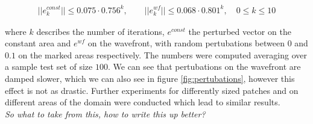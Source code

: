 \documentclass[../draft_1.tex]{subfiles}
\begin{document}
\begin{ceqn}
	\begin{equation}
	\begin{aligned}
|| e_k^{const} || \leq 0.075 \cdot 0.756^k, \qquad || e_k^{wf} || \leq 0.068 \cdot 0.801^k, \quad 0 \leq k \leq 10
	\end{aligned}
	\end{equation}
\end{ceqn}

where $k$ describes the number of iterations, $e^{const}$ the perturbed vector on the constant area and $e^{wf}$ on the wavefront, with random pertubations between $0$ and $0.1$ on the marked areas respectively. The numbers were computed averaging over a sample test set of size $100$. We can see that pertubations on the wavefront are damped slower, which we can also see in figure \ref{fig:pertubations}, however this effect is not as drastic. Further experiments for differently sized patches and on different areas of the domain were conducted which lead to similar results.
\\
 \textit{So what to take from this, how to write this up better?}







\end{document}
